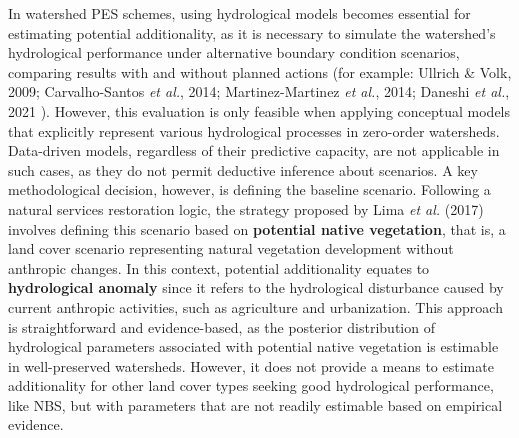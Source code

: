 \documentclass[./main_en.tex]{subfiles}
\begin{document}
In watershed PES schemes, using hydrological models becomes essential for estimating potential additionality, as it is necessary to simulate the watershed's hydrological performance under alternative boundary condition scenarios, comparing results with and without planned actions (for example: Ullrich \& Volk, 2009; Carvalho-Santos \textit{et al.}, 2014; Martinez-Martinez \textit{et al.}, 2014; Daneshi \textit{et al.}, 2021 \cite{Ullrich2009a, Carvalho-santos2014a, Martinez-martinez2014a, Daneshi2021a}). However, this evaluation is only feasible when applying conceptual models that explicitly represent various hydrological processes in zero-order watersheds. Data-driven models, regardless of their predictive capacity, are not applicable in such cases, as they do not permit deductive inference about scenarios. A key methodological decision, however, is defining the baseline scenario. Following a natural services restoration logic, the strategy proposed by Lima \textit{et al.} (2017) \cite{Lima2017} involves defining this scenario based on \textbf{potential native vegetation}, that is, a land cover scenario representing natural vegetation development without anthropic changes. In this context, potential additionality equates to \textbf{hydrological anomaly} since it refers to the hydrological disturbance caused by current anthropic activities, such as agriculture and urbanization. This approach is straightforward and evidence-based, as the posterior distribution of hydrological parameters associated with potential native vegetation is estimable in well-preserved watersheds. However, it does not provide a means to estimate additionality for other land cover types seeking good hydrological performance, like NBS, but with parameters that are not readily estimable based on empirical evidence.
\end{document}
